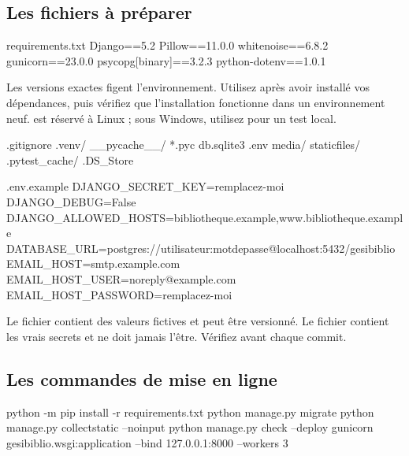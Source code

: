 \subsection{Les fichiers à préparer}

\begin{codebox}[tree]{requirements.txt}
Django==5.2
Pillow==11.0.0
whitenoise==6.8.2
gunicorn==23.0.0
psycopg[binary]==3.2.3
python-dotenv==1.0.1
\end{codebox}

\begin{note}
Les versions exactes figent l'environnement. Utilisez  après avoir installé vos dépendances, puis vérifiez que
l'installation fonctionne dans un environnement neuf.  est réservé
à Linux ; sous Windows, utilisez  pour un test local.
\end{note}

\begin{codebox}[tree]{.gitignore}
.venv/
__pycache__/
*.pyc
db.sqlite3
.env
media/
staticfiles/
.pytest_cache/
.DS_Store
\end{codebox}

\begin{codebox}[tree]{.env.example}
DJANGO_SECRET_KEY=remplacez-moi
DJANGO_DEBUG=False
DJANGO_ALLOWED_HOSTS=bibliotheque.example,www.bibliotheque.example
DATABASE_URL=postgres://utilisateur:motdepasse@localhost:5432/gesibiblio
EMAIL_HOST=smtp.example.com
EMAIL_HOST_USER=noreply@example.com
EMAIL_HOST_PASSWORD=remplacez-moi
\end{codebox}

\begin{attention}
Le fichier  contient des valeurs fictives et peut être
versionné. Le fichier  contient les vrais secrets et ne doit jamais
l'être. Vérifiez  avant chaque commit.
\end{attention}

\subsection{Les commandes de mise en ligne}

\begin{terminal}
python -m pip install -r requirements.txt
python manage.py migrate
python manage.py collectstatic --noinput
python manage.py check --deploy
gunicorn gesibiblio.wsgi:application --bind 127.0.0.1:8000 --workers 3
\end{terminal}

